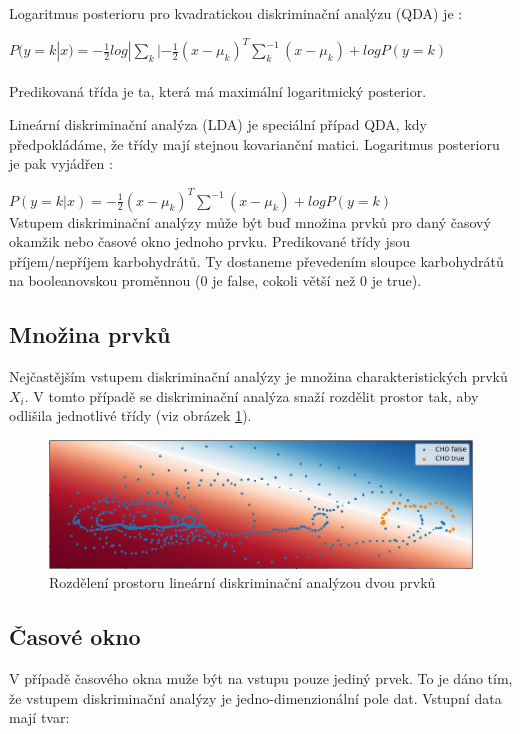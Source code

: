 Logaritmus posterioru pro kvadratickou diskriminační analýzu (QDA) je \citep{cho.book.lda}:

$P(y=k|x)=-\frac{1}{2}log|\sum_{k}|-\frac{1}{2}(x-\mu_{k})^{T}\sum^{-1}_{k}(x-\mu_{k})+logP(y=k)$\\\\
Predikovaná třída je ta, která má maximální logaritmický posterior.

Lineární diskriminační analýza (LDA) je speciální případ QDA, kdy předpokládáme, že třídy mají stejnou kovarianční matici. Logaritmus posterioru je pak vyjádřen \citep{cho.scikit.lda}:

$P(y=k|x)=-\frac{1}{2}(x-\mu_{k})^{T}\sum^{-1}(x-\mu_{k})+logP(y=k)$\\

Vstupem diskriminační analýzy může být buď množina prvků pro daný časový okamžik nebo časové okno jednoho prvku. Predikované třídy jsou příjem/nepříjem karbohydrátů. Ty dostaneme převedením sloupce karbohydrátů na booleanovskou proměnnou (0 je false, cokoli větší než 0 je true).

\subsection{Množina prvků}

Nejčastějším vstupem diskriminační analýzy je množina charakteristických prvků $X_{i}$. V tomto případě se diskriminační analýza snaží rozdělit prostor tak, aby odlišila jednotlivé třídy (viz obrázek \ref{fig:lda}).

\begin{figure}[H]
\caption{Rozdělení prostoru lineární diskriminační analýzou dvou prvků}
\label{fig:lda}
\centering
\includegraphics[width=1\textwidth]{img/cho/lda2.png}
\end{figure}

\subsection{Časové okno}

V případě časového okna muže být na vstupu pouze jediný prvek. To je dáno tím, že vstupem diskriminační analýzy je jedno-dimenzionální pole dat. Vstupní data mají tvar:

